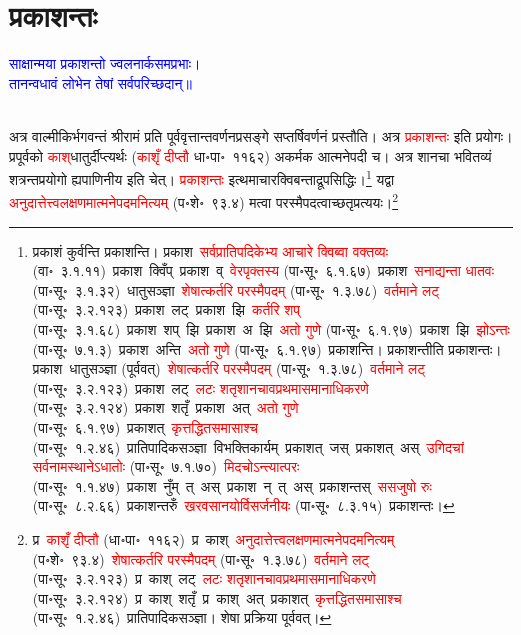 \section[प्रकाशन्तः]{प्रकाशन्तः}
\centering\textcolor{blue}{साक्षान्मया प्रकाशन्तो ज्वलनार्कसमप्रभाः।\nopagebreak\\
तानन्वधावं लोभेन तेषां सर्वपरिच्छदान्॥}\nopagebreak\\
\\
\begin{sloppypar}\justifying\noindent\hspace{10mm} अत्र वाल्मीकिर्भगवन्तं श्रीरामं प्रति पूर्व\-वृत्तान्त\-वर्णन\-प्रसङ्गे सप्तर्षि\-वर्णनं प्रस्तौति। अत्र \textcolor{red}{प्रकाशन्तः} इति प्रयोगः। प्रपूर्वको \textcolor{red}{काश्‌}\-धातुर्दीप्त्यर्थः (\textcolor{red}{काशृँ दीप्तौ} धा॰पा॰~११६२) अकर्मक आत्मनेपदी च। अत्र शानचा भवितव्यं शत्रन्त\-प्रयोगो ह्यपाणिनीय इति चेत्।
\textcolor{red}{प्रकाशन्तः} इत्थमाचार\-क्विबन्ताद्रूप\-सिद्धिः।\footnote{प्रकाशं कुर्वन्ति प्रकाशन्ति। प्रकाश~\arrow \textcolor{red}{सर्वप्राति\-पदिकेभ्य आचारे क्विब्वा वक्तव्यः} (वा॰~३.१.११)~\arrow प्रकाश~क्विँप्~\arrow प्रकाश~व्~\arrow \textcolor{red}{वेरपृक्तस्य} (पा॰सू॰~६.१.६७)~\arrow प्रकाश~\arrow \textcolor{red}{सनाद्यन्ता धातवः} (पा॰सू॰~३.१.३२)~\arrow धातुसञ्ज्ञा~\arrow \textcolor{red}{शेषात्कर्तरि परस्मैपदम्} (पा॰सू॰~१.३.७८)~\arrow \textcolor{red}{वर्तमाने लट्} (पा॰सू॰~३.२.१२३)~\arrow प्रकाश~लट्~\arrow प्रकाश~झि~\arrow \textcolor{red}{कर्तरि शप्‌} (पा॰सू॰~३.१.६८)~\arrow प्रकाश~शप्~झि~\arrow प्रकाश~अ~झि~\arrow \textcolor{red}{अतो गुणे} (पा॰सू॰~६.१.९७)~\arrow प्रकाश~झि~\arrow \textcolor{red}{झोऽन्तः} (पा॰सू॰~७.१.३)~\arrow प्रकाश~अन्ति~\arrow \textcolor{red}{अतो गुणे} (पा॰सू॰~६.१.९७)~\arrow प्रकाशन्ति। प्रकाशन्तीति प्रकाशन्तः। प्रकाश~\arrow धातुसञ्ज्ञा (पूर्ववत्)~\arrow \textcolor{red}{शेषात्कर्तरि परस्मैपदम्} (पा॰सू॰~१.३.७८)~\arrow \textcolor{red}{वर्तमाने लट्} (पा॰सू॰~३.२.१२३)~\arrow प्रकाश~लट्~\arrow \textcolor{red}{लटः शतृशानचावप्रथमा\-समानाधिकरणे} (पा॰सू॰~३.२.१२४)~\arrow प्रकाश~शतृँ~\arrow प्रकाश~अत्~\arrow \textcolor{red}{अतो गुणे} (पा॰सू॰~६.१.९७)~\arrow प्रकाशत्~\arrow \textcolor{red}{कृत्तद्धित\-समासाश्च} (पा॰सू॰~१.२.४६)~\arrow प्रातिपादिक\-सञ्ज्ञा~\arrow विभक्ति\-कार्यम्~\arrow प्रकाशत्~जस्~\arrow प्रकाशत्~अस्~\arrow \textcolor{red}{उगिदचां सर्वनामस्थानेऽधातोः} (पा॰सू॰~७.१.७०)~\arrow \textcolor{red}{मिदचोऽन्त्यात्परः} (पा॰सू॰~१.१.४७)~\arrow प्रकाश~नुँम्~त्~अस्~\arrow प्रकाश~न्~त्~अस्~\arrow प्रकाशन्तस्~\arrow \textcolor{red}{ससजुषो रुः} (पा॰सू॰~८.२.६६)~\arrow प्रकाशन्तरुँ~\arrow \textcolor{red}{खरवसानयोर्विसर्जनीयः} (पा॰सू॰~८.३.१५)~\arrow प्रकाशन्तः।} यद्वा \textcolor{red}{अनुदात्तेत्त्व\-लक्षणमात्मने\-पदमनित्यम्} (प॰शे॰~९३.४) मत्वा परस्मैपदत्वाच्छतृ\-प्रत्ययः।\footnote{प्र~\textcolor{red}{काशृँ दीप्तौ} (धा॰पा॰~११६२)~\arrow प्र~काश्~\arrow \textcolor{red}{अनुदात्तेत्त्व\-लक्षणमात्मने\-पदमनित्यम्} (प॰शे॰~९३.४)~\arrow \textcolor{red}{शेषात्कर्तरि परस्मैपदम्} (पा॰सू॰~१.३.७८)~\arrow \textcolor{red}{वर्तमाने लट्} (पा॰सू॰~३.२.१२३)~\arrow प्र~काश्~लट्~\arrow \textcolor{red}{लटः शतृशानचावप्रथमा\-समानाधिकरणे} (पा॰सू॰~३.२.१२४)~\arrow प्र~काश्~शतृँ~\arrow प्र~काश्~अत्~\arrow प्रकाशत्~\arrow \textcolor{red}{कृत्तद्धित\-समासाश्च} (पा॰सू॰~१.२.४६)~\arrow प्रातिपादिक\-सञ्ज्ञा। शेषा प्रक्रिया पूर्ववत्।}\end{sloppypar}
